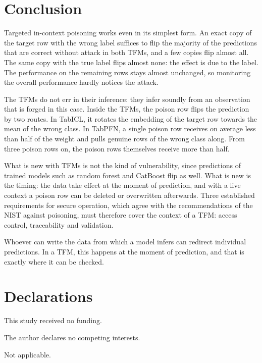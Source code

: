 \documentclass[pdflatex,sn-mathphys-num]{sn-jnl}
\begin{document}
\section{Conclusion}
\label{sec:fazit}

Targeted in-context poisoning works even in its simplest form. An exact
copy of the target row with the wrong label suffices to flip the majority
of the predictions that are correct without attack in both TFMs, and a
few copies flip almost all. The same copy with the true label flips
almost none: the effect is due to the label. The performance on the
remaining rows stays almost unchanged, so monitoring the overall
performance hardly notices the attack.

The TFMs do not err in their inference: they infer soundly from an
observation that is forged in this case. Inside the TFMs, the poison row
flips the prediction by two routes. In TabICL, it rotates the embedding
of the target row towards the mean of the wrong class. In TabPFN, a
single poison row receives on average less than half of the weight and
pulls genuine rows of the wrong class along. From three poison rows on,
the poison rows themselves receive more than half.

What is new with TFMs is not the kind of vulnerability, since
predictions of trained models such as random forest and CatBoost flip as
well. What is new is the timing: the data take effect at the moment of
prediction, and with a live context a poison row can be deleted or
overwritten afterwards. Three established requirements for secure
operation, which agree with the recommendations of the NIST against
poisoning, must therefore cover the context of a TFM: access control,
traceability and validation.

Whoever can write the data from which a model infers can redirect
individual predictions. In a TFM, this happens at the moment of
prediction, and that is exactly where it can be checked.

\backmatter

\section*{Declarations}
\hypersetup{bookmarksdepth=1}

 This study received no funding.

 The author declares no competing interests.

 Not applicable.
\end{document}
